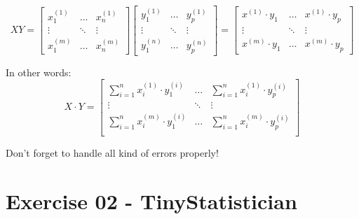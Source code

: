 \documentclass[]{article}
\begin{document}
\large

\[
X  Y = 
\begin{bmatrix} 
x_{1}^{(1)} & \dots & x_{n}^{(1)}  \\ 
\vdots & \ddots & \vdots \\ 
x_{1}^{(m)} & \dots & x_{n}^{(m)} 
\end{bmatrix}  
\begin{bmatrix} 
y_{1}^{(1)} & \dots & y_{p}^{(1)}  \\ 
\vdots & \ddots & \vdots \\ 
y_{1}^{(n)} & \dots & y_{p}^{(n)} 
\end{bmatrix} = 
\begin{bmatrix} 
x^{(1)} \cdot y_1  & \dots & x^{(1)} \cdot y_{p} \\ 
\vdots & \ddots & \vdots \\ 
x^{(m)} \cdot y_1 & \dots & x^{(m)} \cdot y_{p}
\end{bmatrix}
\] \normalsize

In other words: ​ \large \[
X \cdot Y = 
\begin{bmatrix} 
\sum_{i = 1}^{n} x_{i}^{(1)} \cdot y_{1}^{(i)} & \dots & \sum_{i=1}^{n} x_{i}^{(1)} \cdot y_{p}^{(i)} \\
\vdots & \ddots & \vdots \\ 
\sum_{i = 1}^{n} x_{i}^{(m)} \cdot y_{1}^{(i)} & \dots & \sum_{i=1}^{n} x_{i}^{(m)} \cdot y_{p}^{(i)} \\
\end{bmatrix}
\] \normalsize

Don't forget to handle all kind of errors properly!

\clearpage

\hypertarget{exercise-02---tinystatistician-1}{%
\section{Exercise 02 -
TinyStatistician}\label{exercise-02---tinystatistician-1}}
\end{document}
